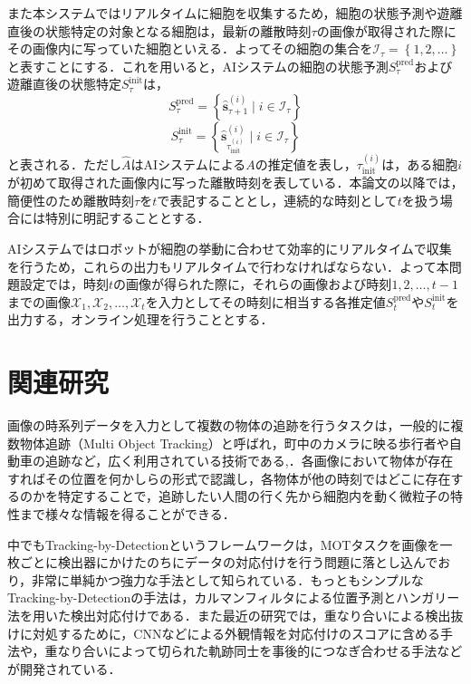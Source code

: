 また本システムではリアルタイムに細胞を収集するため，細胞の状態予測や遊離直後の状態特定の対象となる細胞は，最新の離散時刻$\tau$の画像が取得された際にその画像内に写っていた細胞といえる．よってその細胞の集合を$\mathcal{I}_\tau = \left\{1, 2, \dots\right\}$と表すことにする．これを用いると，AIシステムの細胞の状態予測$S^{\text{pred}}_{\tau}$および遊離直後の状態特定$S^{\text{init}}_{\tau}$は，
\begin{equation}
    \label{eq:cell_state_prediction}
    S^{\text{pred}}_{\tau} = \left\{\hat{\bm{s}}_{\tau + 1}^{(i)} \mid i \in \mathcal{I}_{\tau}\right\}
\end{equation}
\begin{equation}
    \label{eq:cell_initial_state_prediction}
    S^{\text{init}}_{\tau} = \left\{\hat{\bm{s}}_{\tau_{\text{init}}^{(i)}}^{(i)} \mid i \in \mathcal{I}_{\tau}\right\}
\end{equation}
と表される．ただし$\hat{A}$はAIシステムによる$A$の推定値を表し，$\tau_{\text{init}}^{(i)}$は，ある細胞$i$が初めて取得された画像内に写った離散時刻を表している．本論文の以降では，簡便性のため離散時刻$\tau$を$t$で表記することとし，連続的な時刻として$t$を扱う場合には特別に明記することとする．

AIシステムではロボットが細胞の挙動に合わせて効率的にリアルタイムで収集を行うため，これらの出力もリアルタイムで行わなければならない．よって本問題設定では，時刻$t$の画像が得られた際に，それらの画像および時刻$1,2,\dots, t-1$までの画像$\mathcal{X}_1, \mathcal{X}_2, \dots, \mathcal{X}_t$を入力としてその時刻に相当する各推定値$S_t^{\text{pred}}$や$S_t^{\text{init}}$を出力する，オンライン処理を行うこととする．

\section{関連研究}
\label{sec:related_works}

画像の時系列データを入力として複数の物体の追跡を行うタスクは，一般的に複数物体追跡（Multi Object Tracking）\cite{luo2021multiple}と呼ばれ，町中のカメラに映る歩行者や自動車の追跡など，広く利用されている技術である\cite{milan2016mot16,dendorfer2020mot20},．各画像において物体が存在すればその位置を何かしらの形式で認識し，各物体が他の時刻ではどこに存在するのかを特定することで，追跡したい人間の行く先から細胞内を動く微粒子の特性まで様々な情報を得ることができる．

中でもTracking-by-Detectionというフレームワークは，MOTタスクを画像を一枚ごとに検出器にかけたのちにデータの対応付けを行う問題に落とし込んでおり，非常に単純かつ強力な手法として知られている．もっともシンプルなTracking-by-Detectionの手法は，カルマンフィルタによる位置予測とハンガリー法を用いた検出対応付けである．また最近の研究では，重なり合いによる検出抜けに対処するために，CNN\cite{Goodfellow-et-al-2016,lecun1998gradient}などによる外観情報を対応付けのスコアに含める手法\cite{wojke2017simple,du2023strongsort}や，重なり合いによって切られた軌跡同士を事後的につなぎ合わせる手法\cite{zhang2022bytetrack}などが開発されている．

